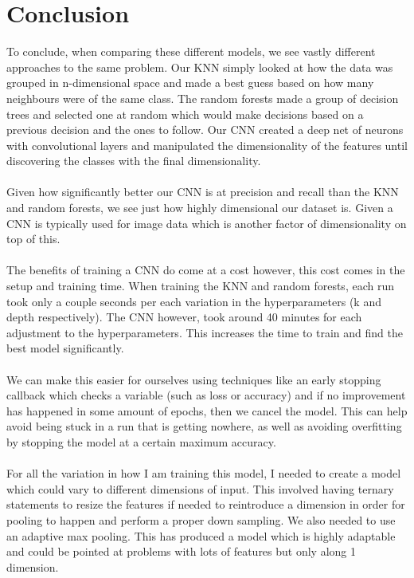 \documentclass[12pt,a4paper]{article}
\begin{document}
    \section{Conclusion}
    To conclude, when comparing these different models, we see vastly different approaches to the same problem.
    Our KNN simply looked at how the data was grouped in n-dimensional space and made a best guess based on how many neighbours
    were of the same class. The random forests made a group of decision trees and selected one at random which would make decisions
    based on a previous decision and the ones to follow. Our CNN created a deep net of neurons with convolutional layers and manipulated the
    dimensionality of the features until discovering the classes with the final dimensionality.
    \\
    \\
    Given how significantly better our CNN is at precision and recall than the KNN and random forests, we see just how
    highly dimensional our dataset is. Given a CNN is typically used for image data which is another factor of dimensionality on top of this.
    \\
    \\
    The benefits of training a CNN do come at a cost however, this cost comes in the setup and training time.
    When training the KNN and random forests, each run took only a couple seconds per each variation in the hyperparameters (k and depth respectively).
    The CNN however, took around 40 minutes for each adjustment to the hyperparameters. This increases the time to train and find the best model significantly.
    \\
    \\
    We can make this easier for ourselves using techniques like an early stopping callback which checks a variable (such as loss or accuracy) and if no improvement
    has happened in some amount of epochs, then we cancel the model. This can help avoid being stuck in a run that is getting nowhere, as well as avoiding overfitting
    by stopping the model at a certain maximum accuracy.
    \\
    \\
    For all the variation in how I am training this model, I needed to create a model which could vary to different dimensions of input. This involved having ternary
    statements to resize the features if needed to reintroduce a dimension in order for pooling to happen and perform a proper down sampling. We also needed
    to use an adaptive max pooling. This has produced a model which is highly adaptable and could be pointed at problems with lots of features but only along 1 dimension.
    
\end{document}
